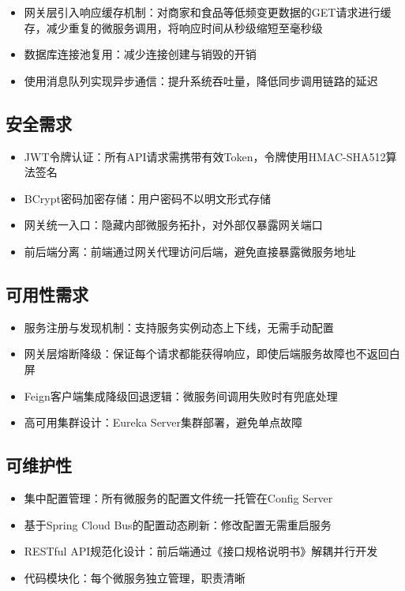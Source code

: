 \begin{itemize}
	\item 网关层引入响应缓存机制：对商家和食品等低频变更数据的GET请求进行缓存，减少重复的微服务调用，将响应时间从秒级缩短至毫秒级
	\item 数据库连接池复用：减少连接创建与销毁的开销
	\item 使用消息队列实现异步通信：提升系统吞吐量，降低同步调用链路的延迟
\end{itemize}

\subsection{安全需求}

\begin{itemize}
	\item JWT令牌认证：所有API请求需携带有效Token，令牌使用HMAC-SHA512算法签名
	\item BCrypt密码加密存储：用户密码不以明文形式存储
	\item 网关统一入口：隐藏内部微服务拓扑，对外部仅暴露网关端口
	\item 前后端分离：前端通过网关代理访问后端，避免直接暴露微服务地址
\end{itemize}

\subsection{可用性需求}

\begin{itemize}
	\item 服务注册与发现机制：支持服务实例动态上下线，无需手动配置
	\item 网关层熔断降级：保证每个请求都能获得响应，即使后端服务故障也不返回白屏
	\item Feign客户端集成降级回退逻辑：微服务间调用失败时有兜底处理
	\item 高可用集群设计：Eureka Server集群部署，避免单点故障
\end{itemize}

\subsection{可维护性}

\begin{itemize}
	\item 集中配置管理：所有微服务的配置文件统一托管在Config Server
	\item 基于Spring Cloud Bus的配置动态刷新：修改配置无需重启服务
	\item RESTful API规范化设计：前后端通过《接口规格说明书》解耦并行开发
	\item 代码模块化：每个微服务独立管理，职责清晰
\end{itemize}

